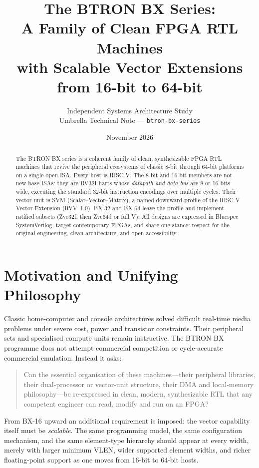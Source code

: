 \documentclass[11pt,a4paper]{article}
\title{\textbf{The BTRON BX Series:\\
A Family of Clean FPGA RTL Machines\\
with Scalable Vector Extensions\\
from 16-bit to 64-bit}}
\author{
  Independent Systems Architecture Study\\
  Umbrella Technical Note --- \texttt{btron-bx-series}
}
\date{November 2026}
\begin{document}
\maketitle

\begin{abstract}
The BTRON BX series is a coherent family of clean, synthesizable FPGA RTL machines that revive the peripheral ecosystems of classic 8-bit through 64-bit platforms on a single open ISA. Every host is RISC-V. The 8-bit and 16-bit members are not new base ISAs: they are RV32I harts whose \emph{datapath and data bus} are 8 or 16 bits wide, executing the standard 32-bit instruction encodings over multiple cycles. Their vector unit is SVM (Scalar--Vector--Matrix), a named downward profile of the RISC-V Vector Extension (RVV~1.0). BX-32 and BX-64 leave the profile and implement ratified subsets (Zve32f, then Zve64d or full V). All designs are expressed in Bluespec SystemVerilog, target contemporary FPGAs, and share one stance: respect for the original engineering, clean architecture, and open accessibility.
\end{abstract}

\section{Motivation and Unifying Philosophy}

Classic home-computer and console architectures solved difficult real-time media problems under severe cost, power and transistor constraints. Their peripheral sets and specialised compute units remain instructive. The BTRON BX programme does not attempt commercial competition or cycle-accurate commercial emulation. Instead it asks:

\begin{quote}
Can the essential organisation of these machines---their peripheral libraries, their dual-processor or vector-unit structure, their DMA and local-memory philosophy---be re-expressed in clean, modern, synthesizable RTL that any competent engineer can read, modify and run on an FPGA?
\end{quote}

From BX-16 upward an additional requirement is imposed: the vector capability itself must be \emph{scalable}. The same programming model, the same configuration mechanism, and the same element-type hierarchy should appear at every width, merely with larger minimum VLEN, wider supported element widths, and richer floating-point support as one moves from 16-bit to 64-bit hosts.
\end{document}
